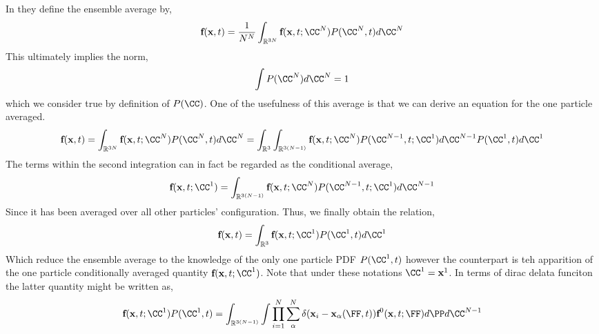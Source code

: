 In \citet{batchelor1972sedimentation} they define the ensemble average by, 
\begin{equation*}
    \textbf{f}(\textbf{x},t)
    = \frac{1}{N^N} 
    \int_{\mathbb{R}^{3N}}
    \textbf{f}(\textbf{x},t;\CC^N)
    P(\CC^N,t)
    d\CC^N
\end{equation*} 
This ultimately implies the norm, 
\begin{equation*}
    \int 
    P(\CC^N)
    d\CC^N
    = 1
\end{equation*}
which we consider true by definition of $P(\CC)$. 
One of the usefulness of this average is that we can derive an equation for the one particle averaged. 
\begin{equation*}
    \textbf{f}(\textbf{x},t)
    = \int_{\mathbb{R}^{3N}}
    \textbf{f}(\textbf{x},t;\CC^N)
    P(\CC^N,t)
    d\CC^N
    = 
    \int_{\mathbb{R}^{3}}
    \int_{\mathbb{R}^{3(N-1)}}
    \textbf{f}(\textbf{x},t;\CC^N)
    P(\CC^{N-1},t;\CC^1)
    d\CC^{N-1}
    P(\CC^1,t)
    d\CC^1
\end{equation*} 
The terms within the second integration can in fact be regarded as the conditional average, 
\begin{equation*}
    \textbf{f}(\textbf{x},t;\CC^1)
    = 
    \int_{\mathbb{R}^{3(N-1)}}
    \textbf{f}(\textbf{x},t;\CC^N)
    P(\CC^{N-1},t;\CC^1)
    d\CC^{N-1}
\end{equation*}
Since it has been averaged over all other particles' configuration. 
Thus, we finally obtain the relation, 
\begin{equation*}
    \textbf{f}(\textbf{x},t)
    =
    \int_{\mathbb{R}^{3}}
    \textbf{f}(\textbf{x},t;\CC^1)P(\CC^1,t)
    d\CC^1
\end{equation*} 
Which reduce the ensemble average to the knowledge of the only one particle PDF 
$P(\CC^1,t)$ however the counterpart is teh apparition of the one particle conditionally averaged quantity $\textbf{f}(\textbf{x},t;\CC^1)$. 
Note that under these notations $\CC^1 = \textbf{x}^1$. 
In terms of dirac delata funciton the latter quantity might be written as, 
\begin{equation*}
    \textbf{f}(\textbf{x},t;\CC^1)P(\CC^1,t)
    = \int_{\mathbb{R}^{3(N-1)}}
    \int 
    \prod_{i=1}^{N}\sum_{\alpha}^{N}\delta(\textbf{x}_i - \textbf{x}_\alpha(\FF,t)) \textbf{f}^0(\textbf{x},t;\FF)
    d\PP
    d\CC^{N-1}
    \label{eq:conditional_def}
\end{equation*}

